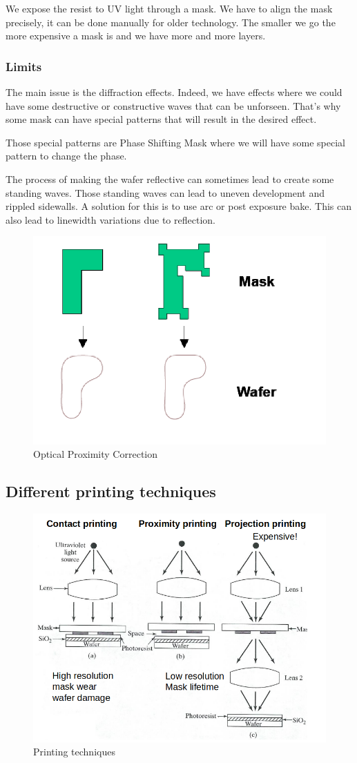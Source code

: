 \documentclass{report}
\begin{document}
We expose the resist to UV light through a mask. We have to align the mask precisely, it can be done manually for older technology. The smaller we go the more expensive a mask is and we have more and more layers.

\subsubsection{Limits}

The main issue is the diffraction effects. Indeed, we have effects where we could have some destructive or constructive waves that can be unforseen. That's why some mask can have special patterns that will result in the desired effect.

Those special patterns are Phase Shifting Mask where we will have some special pattern to change the phase.

The process of making the wafer reflective can sometimes lead to create some standing waves. Those standing waves can lead to uneven development and rippled sidewalls. A solution for this is to use \gls{arc} or post exposure bake. This can also lead to linewidth variations due to reflection.

\begin{figure}[H]
    \centering
    \includegraphics[width=0.5\linewidth]{OPC.png}
    \caption{Optical Proximity Correction}
    \label{fig:enter-label}
\end{figure}

\subsection{Different printing techniques}

\begin{figure}[H]
    \centering
    \includegraphics[width=0.65\linewidth]{printing_techniques.png}
    \caption{Printing techniques}
    \label{fig:enter-label}
\end{figure}
\end{document}
